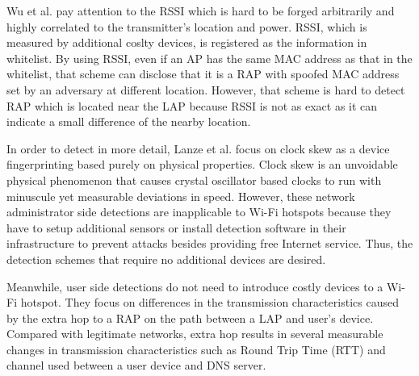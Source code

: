 \documentclass[conference]{IEEEtran}
\begin{document}
Wu et al. \cite{prapd} pay attention to the RSSI which is hard to be forged arbitrarily and highly correlated to the transmitter's location and power.
RSSI, which is measured by additional coslty devices, is registered as the information in whitelist.
By using RSSI, even if an AP has the same MAC address as that in the whitelist, that scheme can disclose that it is a RAP with spoofed MAC address set by an adversary at different location.
However, that scheme is hard to detect RAP which is located near the LAP because RSSI is not as exact as it can indicate a small difference of the nearby location. 

In order to detect in more detail, Lanze et al. \cite{clockskew} focus on clock skew as a device fingerprinting based purely on physical properties.
Clock skew is an unvoidable physical phenomenon that causes crystal oscillator based clocks to run with minuscule yet measurable deviations in speed.
However, these network administrator side detections are inapplicable to Wi-Fi hotspots because they have to setup additional sensors or install detection software in their infrastructure to prevent attacks besides providing free Internet service.
Thus, the detection schemes that require no additional devices are desired.

Meanwhile, user side detections do not need to introduce costly devices to a Wi-Fi hotspot. 
They focus on differences in the transmission characteristics caused by the extra hop to a RAP on the path between a LAP and user's device. 
Compared with legitimate networks, extra hop results in several measurable changes in transmission characteristics such as Round Trip Time (RTT) and channel used between a user device and DNS server.
\end{document}
